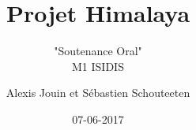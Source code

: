 \documentclass{beamer}
\begin{document}
	\title{Projet Himalaya}
	\subtitle{"Soutenance Oral"\\
		M1 ISIDIS}
	\author {Alexis Jouin et Sébastien Schouteeten}
	\date{07-06-2017}
	\frame[plain]{
		\titlepage
	}

	
\end{document}
